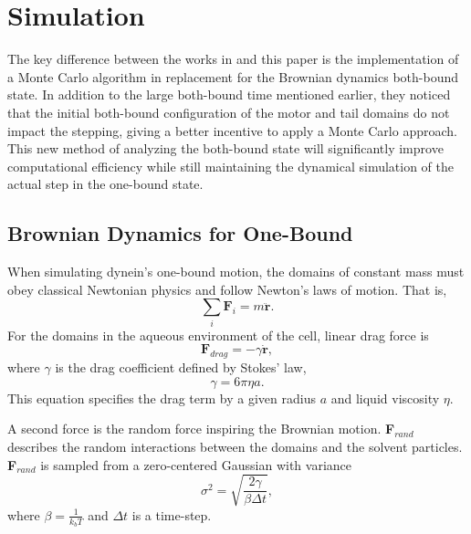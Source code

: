 \section{Simulation}

The key difference between the works in \cite{Capek2017, waczak2019drunken} and this paper is the implementation of a Monte Carlo algorithm in replacement for the Brownian dynamics both-bound state. In addition to the large both-bound time mentioned earlier, they noticed that the initial both-bound configuration of the motor and tail domains do not impact the stepping, giving a better incentive to apply a Monte Carlo approach. This new method of analyzing the both-bound state will significantly improve computational efficiency while still maintaining the dynamical simulation of the actual step in the one-bound state. 



\subsection{Brownian Dynamics for One-Bound}
\label{sec:BrownianDynamics}

When simulating dynein's one-bound motion, the domains of constant mass must obey classical Newtonian physics and follow Newton's laws of motion. That is,
\begin{equation}
	\sum_{i}\textbf{F}_i=m\ddot{\textbf{r}}.
\end{equation} 
For the domains in the aqueous environment of the cell, linear drag force is
\begin{equation}
	\textbf{F}_{drag}=-\gamma \dot{\textbf{r}},
\end{equation}
where $\gamma$ is the drag coefficient defined by Stokes' law,
\begin{equation}
	\gamma=6\pi\eta a.
\end{equation}
This equation specifies the drag term by a given radius $a$ and liquid viscosity $\eta$. 

A second force is the random force inspiring the Brownian motion. \textbf{F}$_{rand}$ describes the random interactions between the domains and the solvent particles. \textbf{F}$_{rand}$ is sampled from a zero-centered Gaussian with variance
\begin{equation}
	\sigma^2=\sqrt{\frac{2\gamma}{\beta\Delta t}},
\end{equation}
where $\beta=\frac{1}{k_bT}$  and $\Delta t$ is a time-step. 

